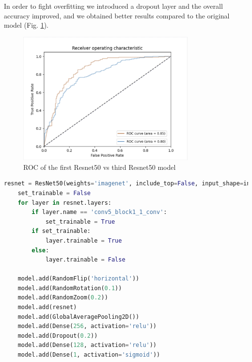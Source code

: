 In order to fight overfitting we introduced a dropout layer and the overall accuracy improved, and we obtained better results compared to the original model (Fig. \ref{fig:ROCResnet}). 
\begin{figure}[H]
    \centering
    \includegraphics[width=0.8\textwidth]{images/ROCResnet.png}
    \caption{ROC of the first Resnet50 vs third Resnet50 model}
    \label{fig:ROCResnet}
\end{figure}

\begin{lstlisting}[language=python, caption={ResNet50, third model code}, label={lst:resnet50CodeThirdTest}]
    resnet = ResNet50(weights='imagenet', include_top=False, input_shape=input_shape)
    set_trainable = False
    for layer in resnet.layers:
        if layer.name == 'conv5_block1_1_conv':
            set_trainable = True
        if set_trainable:
            layer.trainable = True
        else:
            layer.trainable = False

    model.add(RandomFlip('horizontal'))
    model.add(RandomRotation(0.1))
    model.add(RandomZoom(0.2))
    model.add(resnet)
    model.add(GlobalAveragePooling2D())
    model.add(Dense(256, activation='relu'))
    model.add(Dropout(0.2))
    model.add(Dense(128, activation='relu'))
    model.add(Dense(1, activation='sigmoid'))
\end{lstlisting}


